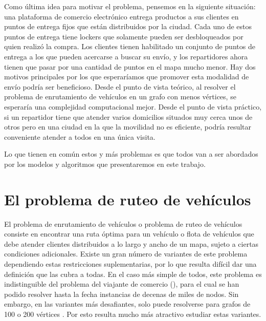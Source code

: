 Como última idea para motivar el problema, pensemos en la siguiente situación: una plataforma de comercio electrónico entrega productos a sus clientes en puntos de entrega fijos que están distribuidos por la ciudad. Cada uno de estos puntos de entrega tiene lockers que solamente pueden ser desbloqueados por quien realizó la compra. Los clientes tienen habilitado un conjunto de puntos de entrega a los que pueden acercarse a buscar su envío, y los repartidores ahora tienen que pasar por una cantidad de puntos en el mapa mucho menor. Hay dos motivos principales por los que esperaríamos que promover esta modalidad de envío podría ser beneficioso. Desde el punto de vista teórico, al resolver el problema de enrutamiento de vehículos en un grafo con menos vértices, se esperaría una complejidad computacional mejor. Desde el punto de vista práctico, si un repartidor tiene que atender varios domicilios situados muy cerca unos de otros pero en una ciudad en la que la movilidad no es eficiente, podría resultar conveniente atender a todos en una única visita. 

Lo que tienen en común estos y más problemas es que todos van a ser abordados por los modelos y algoritmos que presentaremos en este trabajo.  


\section{El problema de ruteo de vehículos}

El problema de enrutamiento de vehículos o problema de ruteo de vehículos consiste en encontrar una ruta óptima para un vehículo o flota de vehículos que debe atender clientes distribuidos a lo largo y ancho de un mapa, sujeto a ciertas condiciones adicionales. Existe un gran número de variantes de este problema dependiendo estas restricciones suplementarias, por lo que resulta difícil dar una definición que las cubra a todas. En el caso más simple de todos, este problema es indistinguible del problema del viajante de comercio (), para el cual se han podido resolver hasta la fecha instancias de decenas de miles de nodos. Sin embargo, en las variantes más desafiantes,  solo puede resolverse para grafos de 100 o 200 vértices \cite{laporte}. Por esto resulta mucho más atractivo estudiar estas variantes.

